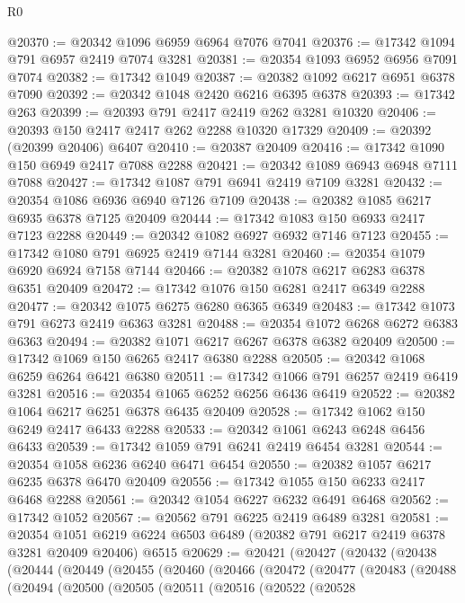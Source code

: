 \begin{lexlean}{R0}
\begin{coremodule}
@20370 := @20342 @1096 @6959 @6964 @7076 @7041
@20376 := @17342 @1094 @791 @6957 @2419 @7074 @3281
@20381 := @20354 @1093 @6952 @6956 @7091 @7074
@20382 := @17342 @1049
@20387 := @20382 @1092 @6217 @6951 @6378 @7090
@20392 := @20342 @1048 @2420 @6216 @6395 @6378
@20393 := @17342 @263
@20399 := @20393 @791 @2417 @2419 @262 @3281 @10320
@20406 := @20393 @150 @2417 @2417 @262 @2288 @10320 @17329
@20409 := @20392 (@20399 @20406) @6407
@20410 := @20387 @20409
@20416 := @17342 @1090 @150 @6949 @2417 @7088 @2288
@20421 := @20342 @1089 @6943 @6948 @7111 @7088
@20427 := @17342 @1087 @791 @6941 @2419 @7109 @3281
@20432 := @20354 @1086 @6936 @6940 @7126 @7109
@20438 := @20382 @1085 @6217 @6935 @6378 @7125 @20409
@20444 := @17342 @1083 @150 @6933 @2417 @7123 @2288
@20449 := @20342 @1082 @6927 @6932 @7146 @7123
@20455 := @17342 @1080 @791 @6925 @2419 @7144 @3281
@20460 := @20354 @1079 @6920 @6924 @7158 @7144
@20466 := @20382 @1078 @6217 @6283 @6378 @6351 @20409
@20472 := @17342 @1076 @150 @6281 @2417 @6349 @2288
@20477 := @20342 @1075 @6275 @6280 @6365 @6349
@20483 := @17342 @1073 @791 @6273 @2419 @6363 @3281
@20488 := @20354 @1072 @6268 @6272 @6383 @6363
@20494 := @20382 @1071 @6217 @6267 @6378 @6382 @20409
@20500 := @17342 @1069 @150 @6265 @2417 @6380 @2288
@20505 := @20342 @1068 @6259 @6264 @6421 @6380
@20511 := @17342 @1066 @791 @6257 @2419 @6419 @3281
@20516 := @20354 @1065 @6252 @6256 @6436 @6419
@20522 := @20382 @1064 @6217 @6251 @6378 @6435 @20409
@20528 := @17342 @1062 @150 @6249 @2417 @6433 @2288
@20533 := @20342 @1061 @6243 @6248 @6456 @6433
@20539 := @17342 @1059 @791 @6241 @2419 @6454 @3281
@20544 := @20354 @1058 @6236 @6240 @6471 @6454
@20550 := @20382 @1057 @6217 @6235 @6378 @6470 @20409
@20556 := @17342 @1055 @150 @6233 @2417 @6468 @2288
@20561 := @20342 @1054 @6227 @6232 @6491 @6468
@20562 := @17342 @1052
@20567 := @20562 @791 @6225 @2419 @6489 @3281
@20581 := @20354
    @1051
    @6219
    @6224
    @6503
    @6489
    (@20382 @791 @6217 @2419 @6378 @3281 @20409 @20406)
    @6515
@20629 := @20421
    (@20427
      (@20432
        (@20438
          (@20444
            (@20449
              (@20455
                (@20460
                  (@20466
                    (@20472
                      (@20477
                        (@20483
                          (@20488
                            (@20494
                              (@20500
                                (@20505
                                  (@20511
                                    (@20516
                                      (@20522
                                        (@20528

\end{coremodule}
\end{lexlean}
